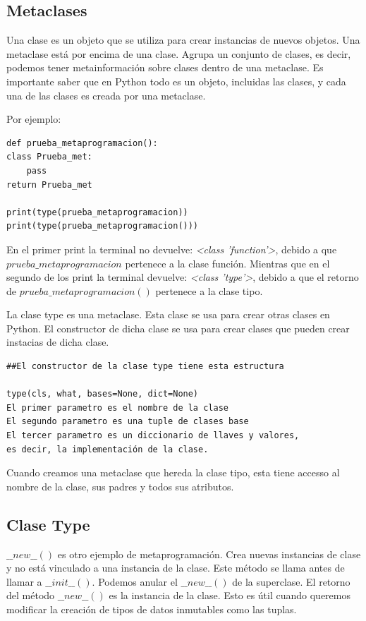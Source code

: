 \documentclass{cosas/tfg_domingo}
\begin{document}
\subsection{Metaclases}
Una clase es un objeto que se utiliza para crear instancias de nuevos objetos.
Una metaclase está por encima de una clase. Agrupa un conjunto de clases, es decir, podemos tener metainformación sobre clases dentro de una metaclase. Es importante saber que en Python todo es un objeto, incluidas las clases, y cada una de las clases es creada por una metaclase.

\hfill

Por ejemplo:

\begin{verbatim}
def prueba_metaprogramacion():
class Prueba_met:
    pass
return Prueba_met

print(type(prueba_metaprogramacion))
print(type(prueba_metaprogramacion()))
\end{verbatim}

En el primer print la terminal no devuelve: \textit{<class 'function'>}, debido a que $prueba\_metaprogramacion$ pertenece a la clase función. Mientras que en el segundo de los print la terminal devuelve: \textit{<class 'type'>}, debido a que el retorno de $prueba\_metaprogramacion()$ pertenece a la clase tipo.

La clase type es una metaclase. Esta clase se usa para crear otras clases en Python. El constructor de dicha clase se usa para crear clases que pueden crear instacias de dicha clase.

\begin{verbatim}
##El constructor de la clase type tiene esta estructura

type(cls, what, bases=None, dict=None)
El primer parametro es el nombre de la clase
El segundo parametro es una tuple de clases base
El tercer parametro es un diccionario de llaves y valores,
es decir, la implementación de la clase.
\end{verbatim}

Cuando creamos una metaclase que hereda la clase tipo, esta tiene accesso al nombre de la clase, sus padres y todos sus atributos.

\subsection{Clase Type}
$\_\_new\_\_()$ es otro ejemplo de metaprogramación. Crea nuevas instancias de clase y no está vinculado a una instancia de la clase. Este método se llama antes de llamar a $\_\_init\_\_()$. Podemos anular el $\_\_new\_\_()$ de la superclase.
El retorno del método $\_\_new\_\_()$ es la instancia de la clase. Esto es útil cuando queremos modificar la creación de tipos de datos inmutables como las tuplas.
\end{document}
